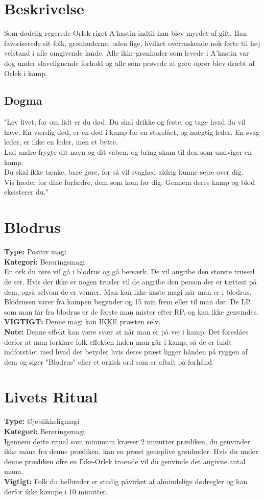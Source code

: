 \section{Beskrivelse}
Som dødelig regerede Orlek riget A’kastin indtil han blev myrdet af gift. Han favoriserede sit folk, grønhuderne, uden lige, hvilket overraskende nok førte til høj velstand i alle omgivende lande. Alle ikke-grønhuder som levede i A’kastin var dog under slavelignende forhold og alle som prøvede at gøre oprør blev dræbt af Orlek i kamp.
\subsection{Dogma}
"Lev livet, for om lidt er du død. Du skal drikke og feste, og tage hvad du vil have. En værdig død, er en død i kamp for en storslået, og mægtig leder. En svag leder, er ikke en leder, men et bytte.\\
Lad andre frygte dit navn og dit våben, og bring skam til den som undviger en kamp.\\
Du skal ikke tænke, bare gøre, for så vil svaghed aldrig kunne sejre over dig.\\
Vis hæder for dine forfædre, dem som kom før dig. Gennem deres kamp og blod eksisterer du."

\section{Blodrus}
\textbf{Type:} Positiv magi\\
\textbf{Kategori:} Berøringsmagi\\
En ork du røre vil gå i blodrus og gå bersærk. De vil angribe den største trussel de ser. Hvis der ikke er nogen trusler vil de angribe den person der er tættest på dem, også selvom de er venner. Man kan ikke kaste magi når man er i blodrus.
Blodrusen varer fra kampen begynder og 15 min frem eller til man dør. De LP som man får fra blodrus er de første man mister efter RP, og kan ikke genvindes.\\
\textbf{VIGTIGT:} Denne magi kan IKKE præsten selv.\\
\textbf{Note:} Denne effekt kan være svær at når man er på vej i kamp. Det foreslåes derfor at man forklare folk effekten inden man går i kamp, så de er fuldt indforstået med hvad det betyder hvis deres præst ligger hånden på ryggen af dem og siger "Blodrus" eller et orkisk ord som er aftalt på forhånd.

\section{Livets Ritual}
\textbf{Type:} Øjeblikkeligmagi\\ 
\textbf{Kategori:} Berøringsmagi\\
Igennem dette ritual som minimum kræver 2 minutter prædiken, du genvinder ikke mana fra denne prædiken, kan en præst genoplive grønhuder. Hvis du under denne prædiken ofre en Ikke-Orlek troende vil du genvinde det angivne antal mana.\\
\textbf{Vigtigt:} Folk du helbreder er stadig påvirket af almindelige dødregler og kan derfor ikke kæmpe i 10 minutter.

